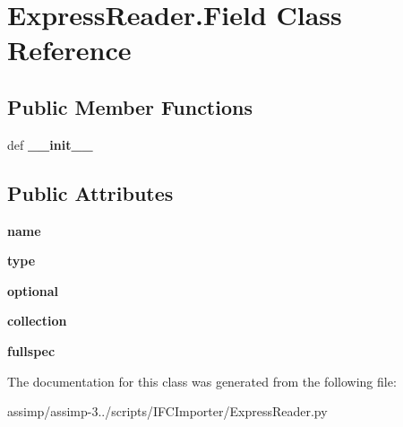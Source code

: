\hypertarget{class_express_reader_1_1_field}{\section{Express\+Reader.\+Field Class Reference}
\label{class_express_reader_1_1_field}
}
\subsection*{Public Member Functions}
\begin{DoxyCompactItemize}
\item 
\hypertarget{class_express_reader_1_1_field_a08816a4c5bdb0564332d754cfc891ca2}{def {\bfseries \+\_\+\+\_\+init\+\_\+\+\_\+}}\label{class_express_reader_1_1_field_a08816a4c5bdb0564332d754cfc891ca2}

\end{DoxyCompactItemize}
\subsection*{Public Attributes}
\begin{DoxyCompactItemize}
\item 
\hypertarget{class_express_reader_1_1_field_ad5116ab67efdd2f036de0783455ff6a5}{{\bfseries name}}\label{class_express_reader_1_1_field_ad5116ab67efdd2f036de0783455ff6a5}

\item 
\hypertarget{class_express_reader_1_1_field_a439a6b898e532eab9e37061f20f336bf}{{\bfseries type}}\label{class_express_reader_1_1_field_a439a6b898e532eab9e37061f20f336bf}

\item 
\hypertarget{class_express_reader_1_1_field_a677fccb4980c1d8fb466ad0d69701f19}{{\bfseries optional}}\label{class_express_reader_1_1_field_a677fccb4980c1d8fb466ad0d69701f19}

\item 
\hypertarget{class_express_reader_1_1_field_ac1d8004243a5f1b2c6545174664890b0}{{\bfseries collection}}\label{class_express_reader_1_1_field_ac1d8004243a5f1b2c6545174664890b0}

\item 
\hypertarget{class_express_reader_1_1_field_ab41bea8ba93fb9a0529e68599b29b321}{{\bfseries fullspec}}\label{class_express_reader_1_1_field_ab41bea8ba93fb9a0529e68599b29b321}

\end{DoxyCompactItemize}


The documentation for this class was generated from the following file\+:\begin{DoxyCompactItemize}
\item 
assimp/assimp-\/3../scripts/\+I\+F\+C\+Importer/Express\+Reader.\+py\end{DoxyCompactItemize}
